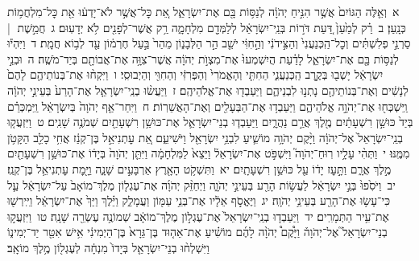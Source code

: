 \documentclass[18pt]{article}
\begin{document}
\startlock
 {\loc א~}וְאֵ֤לֶּה הַגּוֹיִם֙ אֲשֶׁ֣ר הִנִּ֣יחַ יְהֹוָ֔ה לְנַסּ֥וֹת בָּ֖ם אֶת־יִשְׂרָאֵ֑ל אֵ֚ת כׇּל־אֲשֶׁ֣ר לֹא־יָדְע֔וּ אֵ֖ת כׇּל־מִלְחֲמ֥וֹת כְּנָֽעַן׃ \startlock
 {\loc ב~}רַ֗ק לְמַ֙עַן֙ דַּ֚עַת דֹּר֣וֹת בְּנֵֽי־יִשְׂרָאֵ֔ל לְלַמְּדָ֖ם מִלְחָמָ֑ה רַ֥ק אֲשֶׁר־לְפָנִ֖ים לֹ֥א יְדָעֽוּם׃ \startlock
 {\loc ג~}חֲמֵ֣שֶׁת  |  סַרְנֵ֣י פְלִשְׁתִּ֗ים וְכׇל־הַֽכְּנַעֲנִי֙ וְהַצִּ֣ידֹנִ֔י וְהַ֣חִוִּ֔י יֹשֵׁ֖ב הַ֣ר הַלְּבָנ֑וֹן מֵהַר֙ בַּ֣עַל חֶרְמ֔וֹן עַ֖ד לְב֥וֹא חֲמָֽת׃ \startlock
 {\loc ד~}וַיִּהְי֕וּ לְנַסּ֥וֹת בָּ֖ם אֶת־יִשְׂרָאֵ֑ל לָדַ֗עַת הֲיִשְׁמְעוּ֙ אֶת־מִצְוֺ֣ת יְהֹוָ֔ה אֲשֶׁר־צִוָּ֥ה אֶת־אֲבוֹתָ֖ם בְּיַד־מֹשֶֽׁה׃ \startlock
 {\loc ה~}וּבְנֵ֣י יִשְׂרָאֵ֔ל יָשְׁב֖וּ בְּקֶ֣רֶב הַֽכְּנַעֲנִ֑י הַחִתִּ֤י וְהָאֱמֹרִי֙ וְהַפְּרִזִּ֔י וְהַחִוִּ֖י וְהַיְבוּסִֽי׃ \startlock
 {\loc ו~}וַיִּקְח֨וּ אֶת־בְּנוֹתֵיהֶ֤ם לָהֶם֙ לְנָשִׁ֔ים וְאֶת־בְּנוֹתֵיהֶ֖ם נָתְנ֣וּ לִבְנֵיהֶ֑ם וַיַּעַבְד֖וּ אֶת־אֱלֹהֵיהֶֽם׃ \startlock
 {\loc ז~}וַיַּעֲשׂ֨וּ בְנֵֽי־יִשְׂרָאֵ֤ל אֶת־הָרַע֙ בְּעֵינֵ֣י יְהֹוָ֔ה וַֽיִּשְׁכְּח֖וּ אֶת־יְהֹוָ֣ה אֱלֹהֵיהֶ֑ם וַיַּעַבְד֥וּ אֶת־הַבְּעָלִ֖ים וְאֶת־הָאֲשֵׁרֽוֹת׃ \startlock
 {\loc ח~}וַיִּחַר־אַ֤ף יְהֹוָה֙ בְּיִשְׂרָאֵ֔ל וַֽיִּמְכְּרֵ֗ם בְּיַד֙ כּוּשַׁ֣ן רִשְׁעָתַ֔יִם מֶ֖לֶךְ אֲרַ֣ם נַהֲרָ֑יִם וַיַּעַבְד֧וּ בְנֵי־יִשְׂרָאֵ֛ל אֶת־כּוּשַׁ֥ן רִשְׁעָתַ֖יִם שְׁמֹנֶ֥ה שָׁנִֽים׃ \startlock
 {\loc ט~}וַיִּזְעֲק֤וּ בְנֵֽי־יִשְׂרָאֵל֙ אֶל־יְהֹוָ֔ה וַיָּ֨קֶם יְהֹוָ֥ה מוֹשִׁ֛יעַ לִבְנֵ֥י יִשְׂרָאֵ֖ל וַיֹּשִׁיעֵ֑ם אֵ֚ת עׇתְנִיאֵ֣ל בֶּן־קְנַ֔ז אֲחִ֥י כָלֵ֖ב הַקָּטֹ֥ן מִמֶּֽנּוּ׃ \startlock
 {\loc י~}וַתְּהִ֨י עָלָ֥יו רֽוּחַ־יְהֹוָה֮ וַיִּשְׁפֹּ֣ט אֶת־יִשְׂרָאֵל֒ וַיֵּצֵא֙ לַמִּלְחָמָ֔ה וַיִּתֵּ֤ן יְהֹוָה֙ בְּיָד֔וֹ אֶת־כּוּשַׁ֥ן רִשְׁעָתַ֖יִם מֶ֣לֶךְ אֲרָ֑ם וַתָּ֣עׇז יָד֔וֹ עַ֖ל כּוּשַׁ֥ן רִשְׁעָתָֽיִם׃ \startlock
 {\loc יא~}וַתִּשְׁקֹ֥ט הָאָ֖רֶץ אַרְבָּעִ֣ים שָׁנָ֑ה וַיָּ֖מׇת עׇתְנִיאֵ֥ל בֶּן־קְנַֽז׃ \startlock
 {\loc יב~}וַיֹּסִ֙פוּ֙ בְּנֵ֣י יִשְׂרָאֵ֔ל לַעֲשׂ֥וֹת הָרַ֖ע בְּעֵינֵ֣י יְהֹוָ֑ה וַיְחַזֵּ֨ק יְהֹוָ֜ה אֶת־עֶגְל֤וֹן מֶלֶךְ־מוֹאָב֙ עַל־יִשְׂרָאֵ֔ל עַ֛ל כִּי־עָשׂ֥וּ אֶת־הָרַ֖ע בְּעֵינֵ֥י יְהֹוָֽה׃ \startlock
 {\loc יג~}וַיֶּאֱסֹ֣ף אֵלָ֔יו אֶת־בְּנֵ֥י עַמּ֖וֹן וַעֲמָלֵ֑ק וַיֵּ֗לֶךְ וַיַּךְ֙ אֶת־יִשְׂרָאֵ֔ל וַיִּֽירְשׁ֖וּ אֶת־עִ֥יר הַתְּמָרִֽים׃ \startlock
 {\loc יד~}וַיַּעַבְד֤וּ בְנֵֽי־יִשְׂרָאֵל֙ אֶת־עֶגְל֣וֹן מֶלֶךְ־מוֹאָ֔ב שְׁמוֹנֶ֥ה עֶשְׂרֵ֖ה שָׁנָֽה׃ \startlock
 {\loc טו~}וַיִּזְעֲק֣וּ בְנֵי־יִשְׂרָאֵל֮ אֶל־יְהֹוָה֒ וַיָּ֩קֶם֩ יְהֹוָ֨ה לָהֶ֜ם מוֹשִׁ֗יעַ אֶת־אֵה֤וּד בֶּן־גֵּרָא֙ בֶּן־הַיְמִינִ֔י אִ֥ישׁ אִטֵּ֖ר יַד־יְמִינ֑וֹ וַיִּשְׁלְח֨וּ בְנֵי־יִשְׂרָאֵ֤ל בְּיָדוֹ֙ מִנְחָ֔ה לְעֶגְל֖וֹן מֶ֥לֶךְ מוֹאָֽב׃ \startlock
\end{document}
